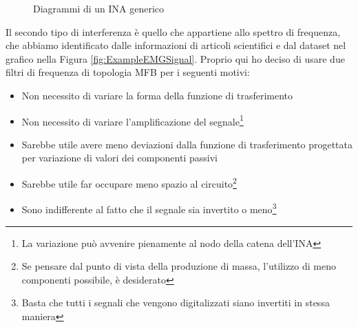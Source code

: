 \documentclass[a4paper, 10pt, final]{article} %
\begin{document}
\begin{figure}[H]
\begin{minipage}[H]{.64\linewidth}
            \label{fig:INAInternalSchematic}
        \end{minipage}
        \hspace{.04\linewidth}
        \caption{Diagrammi di un INA generico}
        \label{fig:INASchematic}
    \end{figure}

    Il secondo tipo di interferenza \`{e} quello che appartiene allo spettro di frequenza, che abbiamo identificato dalle informazioni di articoli scientifici e dal dataset nel grafico nella Figura \ref{fig:ExampleEMGSignal}.
    Proprio qui ho deciso di usare due filtri di frequenza di topologia MFB per i seguenti motivi:
    \begin{itemize}
        \item Non necessito di variare la forma della funzione di trasferimento
        \item Non necessito di variare l'amplificazione del segnale\footnote{La variazione pu\`{o} avvenire pienamente al nodo della catena dell'INA}
        \item Sarebbe utile avere meno deviazioni dalla funzione di trasferimento progettata per variazione di valori dei componenti passivi 
        \item Sarebbe utile far occupare meno spazio al circuito\footnote{Se pensare dal punto di vista della produzione di massa, l'utilizzo di meno componenti possibile, \`{e} desiderato}
        \item Sono indifferente al fatto che il segnale sia invertito o meno\footnote{Basta che tutti i segnali che vengono digitalizzati siano invertiti in stessa maniera}
    \end{itemize}
    
\end{document}
